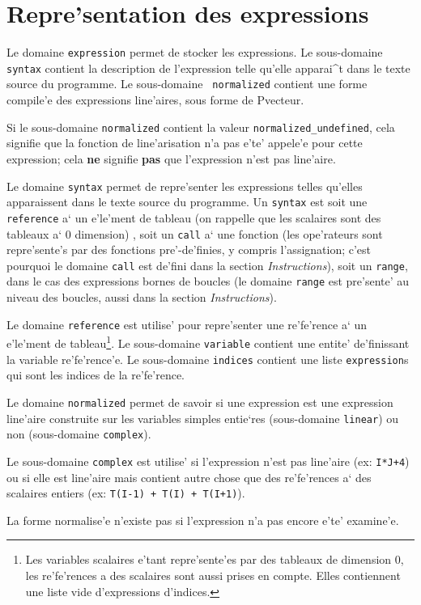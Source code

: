 \section{Repre'sentation des expressions}
\label{expression}

{ 
Le domaine \verb/expression/ permet de stocker les expressions.  Le
sous-domaine {\tt syntax} contient la description de l'expression telle
qu'elle apparai^t dans le texte source du programme. Le sous-domaine {\tt
normalized} contient une forme compile'e des expressions line'aires,
sous forme de Pvecteur.

Si le sous-domaine {\tt normalized} contient la valeur
{\tt normalized\_undefined}, cela signifie que la fonction de line'arisation
n'a pas e'te' appele'e pour cette expression; cela {\bf ne} signifie
{\bf pas}
que l'expression n'est pas line'aire.
}

{
Le domaine \verb/syntax/ permet de repre'senter les expressions telles
qu'elles apparaissent dans le texte source du programme. Un
\verb/syntax/ est soit une \verb/reference/ a` un e'le'ment de tableau
(on rappelle que les scalaires sont des tableaux a` 0 dimension) , soit
un \verb/call/ a` une fonction (les ope'rateurs sont repre'sente's par
des fonctions pre'-de'finies, y compris l'assignation; c'est pourquoi le
domaine {\tt call} est de'fini dans la section {\em Instructions}), soit
un \verb/range/, dans le cas des expressions bornes de boucles (le domaine
{\tt range} est pre'sente' au niveau des boucles, aussi dans la section
{\em Instructions}).
}

{
Le domaine \verb/reference/ est utilise' pour repre'senter une
re'fe'rence a` un e'le'ment de tableau\footnote{Les variables scalaires
e'tant repre'sente'es par des tableaux de dimension 0, les re'fe'rences
a des scalaires sont aussi prises en compte. Elles contiennent une liste
vide d'expressions d'indices.}.  Le sous-domaine \verb/variable/
contient une entite' de'finissant la variable re'fe'rence'e. Le
sous-domaine \verb/indices/ contient une liste {\tt expression}s qui sont les
indices de la re'fe'rence.
}

{ Le domaine {\tt normalized} permet de savoir si une expression est une
expression line'aire construite sur les variables simples entie`res
(sous-domaine {\tt linear}) ou non (sous-domaine {\tt complex}).

Le sous-domaine {\tt complex} est utilise' si l'expression n'est pas
line'aire (ex: {\tt I*J+4}) ou si elle est line'aire mais contient autre
chose que des re'fe'rences a` des scalaires entiers (ex: {\tt T(I-1) +
T(I) + T(I+1)}).

La forme normalise'e n'existe pas si l'expression n'a pas encore e'te'
examine'e. }

